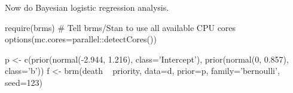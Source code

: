 Now do Bayesian logistic regression analysis.

\begin{Schunk}
\begin{Sinput}
require(brms)
# Tell brms/Stan to use all available CPU cores
options(mc.cores=parallel::detectCores())
\end{Sinput}
\end{Schunk}

\begin{Schunk}
\begin{Sinput}
p <- c(prior(normal(-2.944, 1.216), class='Intercept'),
       prior(normal(0, 0.857),      class='b'))
f <- brm(death ~ priority, data=d, prior=p, family='bernoulli', seed=123)
\end{Sinput}
\end{Schunk}

